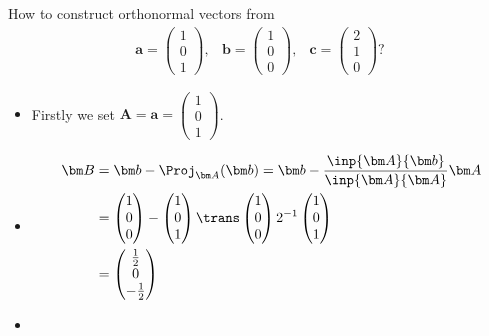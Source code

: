 \begin{example}
How to construct orthonormal vectors from 
\[
\begin{array}{lll}
\bm a=\begin{pmatrix}
1\\0\\1
\end{pmatrix},
&
\bm b=\begin{pmatrix}
1\\0\\0
\end{pmatrix},
&
\bm c=\begin{pmatrix}
2\\1\\0
\end{pmatrix}?
\end{array}
\]
\begin{itemize}
\item
Firstly we set $\bm A=\bm a=\begin{pmatrix}
1\\0\\1
\end{pmatrix}$.
\item
\[
\begin{aligned}
\bm B&=\bm b-\Proj_{\bm A}(\bm b)=\bm b-\frac{\inp{\bm A}{\bm b}}{\inp{\bm A}{\bm A}}\bm A\\
&=\begin{pmatrix}
1\\0\\0
\end{pmatrix}-\begin{pmatrix}
1\\0\\1
\end{pmatrix}\trans\begin{pmatrix}
1\\0\\0
\end{pmatrix}2^{-1}\begin{pmatrix}
1\\0\\1
\end{pmatrix}\\
&=\begin{pmatrix}
\frac{1}{2}\\0\\-\frac{1}{2}
\end{pmatrix}
\end{aligned}
\]
\item
\[
\begin{aligned}

\end{aligned}\]
\end{itemize}
\end{example}
